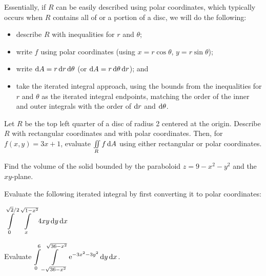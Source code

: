 Essentially, if $R$ can be easily described using polar coordinates, which typically occurs when $R$ contains all of or a portion of a disc, we will do the following: 
\begin{itemize} 
    \item describe $R$ with inequalities for $r$ and $\theta$; 
    \item write $f$ using polar coordinates (using $x=r\cos\theta$, $y=r\sin\theta$); 
    \item write $\mathop{}\!\mathrm{d} A=r \mathop{}\!\mathrm{d} r \mathop{}\!\mathrm{d} \theta$ (or $\mathop{}\!\mathrm{d} A=r \mathop{}\!\mathrm{d} \theta \mathop{}\!\mathrm{d} r$); and 
    \item take the iterated integral approach, using the bounds from the inequalities for $r$ and $\theta$ as the iterated integral endpoints, matching the order of the inner and outer integrals with the order of $\mathop{}\!\mathrm{d} r$ and $\mathop{}\!\mathrm{d} \theta$.
\end{itemize} 
\pagebreak 

\begin{ex}
    Let $R$ be the top left quarter of a disc of radius 2 centered at the origin. Describe $R$ with rectangular coordinates and with polar coordinates. Then, for $f(x,y)=3x+1$, evaluate $\iint\limits_R f\mathop{}\!\mathrm{d} A$ using either rectangular or polar coordinates. 
\end{ex}
\vfill

\begin{ex}
    Find the volume of the solid bounded by the paraboloid $z=9-x^2-y^2$ and the $xy$-plane.
\end{ex}
\vfill 

\pagebreak

\begin{ex}
    Evaluate the following iterated integral by first converting it to polar coordinates:
    \medskip 
    
    \noindent $\displaystyle \int\limits_0^{\sqrt{2}/2} \int\limits_x^{\sqrt{1-x^2}} 4xy\mathop{}\!\mathrm{d} y\mathop{}\!\mathrm{d} x$
\end{ex}
\vfill 

\begin{ex}
    Evaluate $\displaystyle\int\limits_0^6 \int\limits_{-\sqrt{36-x^2}}^{\sqrt{36-x^2}} \mathrm{e}^{-3x^2-3y^2}\mathop{}\!\mathrm{d} y\mathop{}\!\mathrm{d} x$.
\end{ex}
\vfill 

